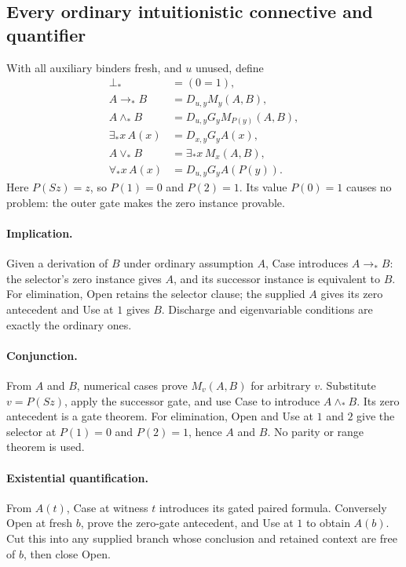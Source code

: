 \documentclass[10pt,letterpaper]{article}
\theoremstyle{definition}
\theoremstyle{remark}
\begin{document}
\subsection{Every ordinary intuitionistic connective and quantifier}

With all auxiliary binders fresh, and $u$ unused, define
\[
\begin{aligned}
 \bot_*&=(0=1),\\
 A\to_*B&=D_{u,y}M_y(A,B),\\
 A\land_*B&=D_{u,y}G_yM_{P(y)}(A,B),\\
 \exists_*x\,A(x)&=D_{x,y}G_yA(x),\\
 A\lor_*B&=\exists_*x\,M_x(A,B),\\
 \forall_*x\,A(x)&=D_{u,y}G_y A(P(y)).
\end{aligned}
\tag{Logical macros}
\]
Here $P(Sz)=z$, so $P(1)=0$ and $P(2)=1$. Its value $P(0)=1$
causes no problem: the outer gate makes the zero instance provable.

\paragraph{Implication.}
Given a derivation of $B$ under ordinary assumption $A$, Case introduces
$A\to_*B$: the selector's zero instance gives $A$, and its successor
instance is equivalent to $B$. For elimination, Open retains the selector
clause; the supplied $A$ gives its zero antecedent and Use at $1$ gives
$B$. Discharge and eigenvariable conditions are exactly the ordinary ones.

\paragraph{Conjunction.}
From $A$ and $B$, numerical cases prove $M_v(A,B)$ for arbitrary $v$.
Substitute $v=P(Sz)$, apply the successor gate, and use Case to introduce
$A\land_*B$. Its zero antecedent is a gate theorem. For elimination,
Open and Use at $1$ and $2$ give the selector at $P(1)=0$ and
$P(2)=1$, hence $A$ and $B$. No parity or range theorem is used.

\paragraph{Existential quantification.}
From $A(t)$, Case at witness $t$ introduces its gated paired formula.
Conversely Open at fresh $b$, prove the zero-gate antecedent, and Use at
$1$ to obtain $A(b)$. Cut this into any supplied branch whose conclusion
and retained context are free of $b$, then close Open.
\end{document}
